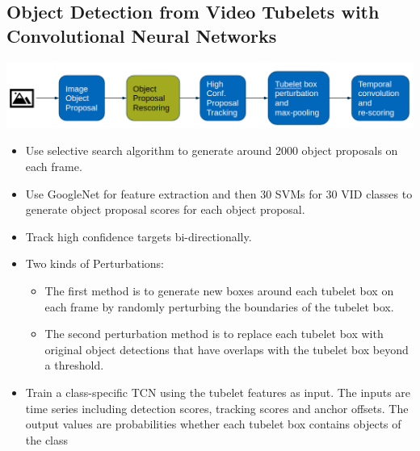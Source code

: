 \documentclass[conference]{IEEEtran}
\begin{document}
\subsection{Object Detection from Video Tubelets with Convolutional Neural Networks}
\includegraphics[width=\columnwidth]{video-tubelets-architecture}
\begin{itemize}
	\item Use selective search algorithm to generate around 2000 object proposals on each frame.
	\item Use GoogleNet for feature extraction and then 30 SVMs for 30 VID classes to generate object proposal scores for each object proposal.
	\item Track high confidence targets bi-directionally.
	\item Two kinds of Perturbations:
	\begin{itemize}
		\item The first method is to generate new boxes around each tubelet box on each frame by randomly perturbing the boundaries of the tubelet box.
		\item The second perturbation method is to replace each tubelet box with original object detections that have overlaps with the tubelet box beyond a threshold.	
	\end{itemize}
	\item Train a class-specific TCN using the tubelet features as input. The inputs are time series including detection scores, tracking scores and anchor offsets. The output values are probabilities whether each tubelet box contains objects of the class
\end{itemize}
\end{document}
